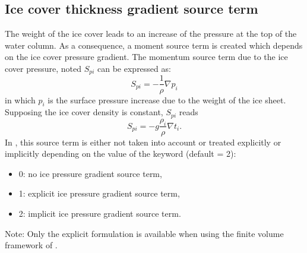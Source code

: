 \subsection{Ice cover thickness gradient source term}

The weight of the ice cover leads to an increase of the pressure at the top of the water column.
As a consequence, a moment source term is created which depends on the ice cover 
pressure gradient. The momentum source term due to the ice cover pressure,
noted $S_{pi}$ can be expressed as:
\begin{equation}
  S_{pi}= - \dfrac{1}{\rho} \nabla p_i
\end{equation}
in which $p_i$ is the surface pressure increase due to the weight of the ice sheet.
Supposing the ice cover density is constant, $S_{pi}$ reads
\begin{equation}
  S_{pi}= - g \dfrac{\rho_i}{\rho} \nabla t_i.
\end{equation}
In \khione, this source term is either not taken into account or treated explicitly or implicitly 
depending on the value of the keyword  (default = 2):
\begin{itemize}
 \item 0: no ice pressure gradient source term,
 \item 1: explicit ice pressure gradient source term,
 \item 2: implicit ice pressure gradient source term.
\end{itemize}

\begin{WarningBlock}{Note:}
Only the explicit formulation is available when using the finite volume framework of .
\end{WarningBlock}

\renewcommand{\labelitemi}{\textbullet}

\clearpage
